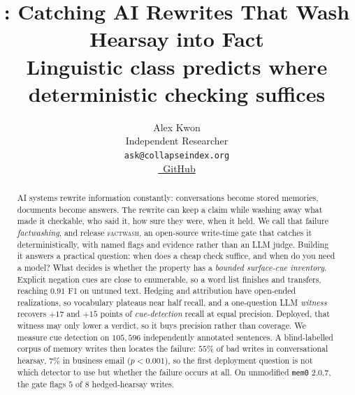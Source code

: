 \documentclass[11pt]{article}
\title{\sys: Catching AI Rewrites That Wash Hearsay into Fact\\
{\large\normalfont Linguistic class predicts where deterministic checking suffices}}
\author{
  Alex Kwon \\
  Independent Researcher \\
  \texttt{ask@collapseindex.org} \\[4pt]
  \href{https://github.com/collapseindex/factwash}{\faGithub~GitHub}
}
\newcommand{\sys}{\textsc{factwash}\xspace}
\begin{document}
\maketitle

\begin{abstract}
AI systems rewrite information constantly: conversations become stored memories,
documents become answers. The rewrite can keep a claim while washing away what made it
checkable, who said it, how sure they were, when it held. We call that failure
\emph{factwashing}, and release \sys, an open-source write-time gate that catches it
deterministically, with named flags and evidence rather than an LLM judge. Building it
answers a practical question: when does a cheap check suffice, and when do you need a
model? What decides is whether the property has a \emph{bounded surface-cue inventory}.
Explicit negation cues are close to enumerable, so a word list finishes and transfers,
reaching $0.91$ F1 on untuned text. Hedging and attribution have open-ended realizations,
so vocabulary plateaus near half recall, and a one-question LLM \emph{witness} recovers
$+17$ and $+15$ points of \emph{cue-detection} recall at equal precision. Deployed, that
witness may only lower a verdict, so it buys precision rather than coverage. We measure
cue detection on $105{,}596$ independently annotated sentences. A blind-labelled corpus of memory
writes then locates the failure: $55\%$ of bad writes in conversational hearsay, $7\%$ in
business email ($p < 0.001$), so the first deployment question is not which detector to
use but whether the failure occurs at all. On unmodified \texttt{mem0} $2.0.7$, the gate
flags $5$ of $8$ hedged-hearsay writes.
\end{abstract}
\end{document}
